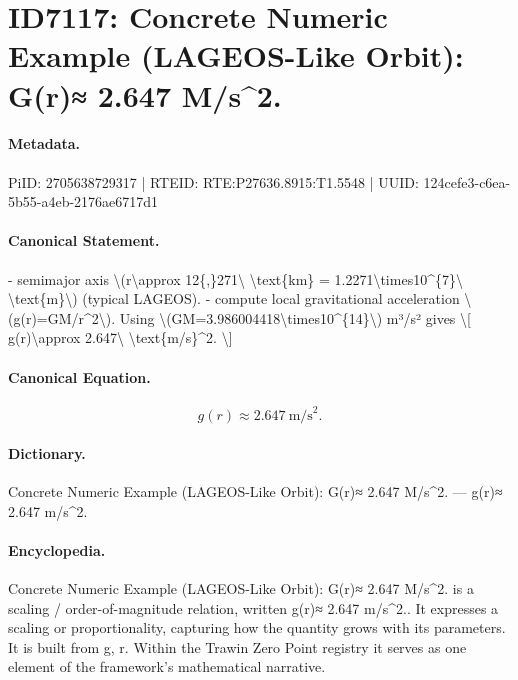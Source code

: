 \section*{ID7117: Concrete Numeric Example (LAGEOS-Like Orbit): G(r)≈ 2.647 M/s\textasciicircum{}2.}
\paragraph{Metadata.}
PiID: 2705638729317 | RTEID: RTE:P27636.8915:T1.5548 | UUID: 124cefe3-c6ea-5b55-a4eb-2176ae6717d1

\paragraph{Canonical Statement.}
- semimajor axis \textbackslash{}(r\textbackslash{}approx 12\{,\}271\textbackslash{} \textbackslash{}text\{km\} = 1.2271\textbackslash{}times10\textasciicircum{}\{7\}\textbackslash{} \textbackslash{}text\{m\}\textbackslash{}) (typical LAGEOS). - compute local gravitational acceleration \textbackslash{}(g(r)=GM/r\textasciicircum{}2\textbackslash{}). Using \textbackslash{}(GM=3.986004418\textbackslash{}times10\textasciicircum{}\{14\}\textbackslash{}) m³/s² gives \textbackslash{}[ g(r)\textbackslash{}approx 2.647\textbackslash{} \textbackslash{}text\{m/s\}\textasciicircum{}2. \textbackslash{}]

\paragraph{Canonical Equation.}
\[
g(r)\approx 2.647\ \text{m/s}^2.
\]

\paragraph{Dictionary.}
Concrete Numeric Example (LAGEOS-Like Orbit): G(r)≈ 2.647 M/s\textasciicircum{}2. — g(r)≈ 2.647 m/s\textasciicircum{}2.

\paragraph{Encyclopedia.}
Concrete Numeric Example (LAGEOS-Like Orbit): G(r)≈ 2.647 M/s\textasciicircum{}2. is a scaling / order-of-magnitude relation, written g(r)≈ 2.647 m/s\textasciicircum{}2.. It expresses a scaling or proportionality, capturing how the quantity grows with its parameters. It is built from g, r. Within the Trawin Zero Point registry it serves as one element of the framework's mathematical narrative.
